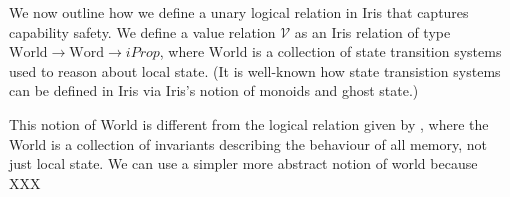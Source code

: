 \documentclass[sigplan,review]{acmart}\settopmatter{printfolios=true,printccs=false,printacmref=false}
\newcommand{\bigsep}{\mathop{\scalebox{2.5}{\raisebox{-0.4ex}{$*$}}}}%
\newcommand{\interp}[2]{(#1)(#2)}
\begin{document}
	



\newcommand{\World}{\mathrm{World}} \newcommand{\Word}{\mathrm{Word}} We now outline how we define a unary logical relation in Iris that captures capability safety.
We define a value relation $\mathcal{V}$ as an Iris relation of type $\World \to \Word \to iProp$, where $\World$ is a collection of state transition systems used to reason about local state.
(It is well-known how state transistion systems can be defined in Iris via Iris's notion of monoids and ghost state.)

This notion of World is different from the logical relation given by \cite{skorstengaardESOP18}, where the World is a collection of invariants describing the behaviour of all memory, not just local state.
We can use a simpler more abstract notion of world because XXX
\end{document}
